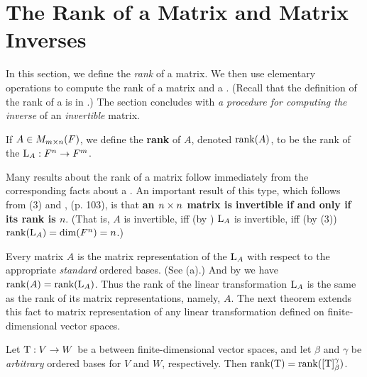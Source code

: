 \section{The Rank of a Matrix and Matrix Inverses} \label{sec 3.2}

In this section, we define the \emph{rank} of a matrix.
We then use elementary operations to compute the rank of a matrix and a \LTRAN{}.
(Recall that the definition of the rank of a \LTRAN{} is in .)
The section concludes with \emph{a procedure for computing the inverse} of an \emph{invertible} matrix.

\begin{definition} \label{def 3.3}
If \(A \in M_{m \times n}(F)\), we define the \textbf{rank} of \(A\), denoted \(\mathrm{rank}(A)\), to be the rank of the \LTRAN{} \(\mathrm{L}_A: F^n \to F^m\).
\end{definition}

\begin{remark} \label{remark 3.2.1}
Many results about the rank of a matrix follow immediately from the corresponding facts about a \LTRAN{}.
An important result of this type, which follows from (3) and , (p. 103), is that \textbf{an \(n \times n\) matrix is invertible if and only if its rank is \(n\)}.
(That is, \(A\) is invertible, iff (by ) \(\mathrm{L}_A\) is invertible, iff (by (3)) \(\mathrm{rank}(\mathrm{L}_A) = \dim(F^n) = n\).) 
\end{remark}

\begin{remark} \label{remark 3.2.2}
Every matrix \(A\) is the matrix representation of the \LTRAN{} \(\mathrm{L}_A\) with respect to the appropriate \emph{standard} ordered bases.
(See (a).)
And by  we have \(\mathrm{rank}(A) = \mathrm{rank}(\mathrm{L}_A)\).
Thus the rank of the linear transformation \(\mathrm{L}_A\) is the same as the rank of  its matrix representations, namely, \(A\).
The next theorem extends this fact to  matrix representation of any linear transformation defined on finite-dimensional vector spaces.
\end{remark}

\begin{theorem} \label{thm 3.3}
Let \(\mathrm{T} : V \to W\) be a \LTRAN{} between finite-dimensional vector spaces, and let \(\beta\) and \(\gamma\) be \emph{arbitrary} ordered bases for \(V\) and \(W\), respectively.
Then \(\mathrm{rank}(\mathrm{T}) = \mathrm{rank}([\mathrm{T}]_{\beta}^{\gamma})\).
\end{theorem}

